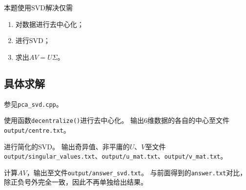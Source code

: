 本题使用SVD解决仅需
\begin{enumerate}
    \item 对数据进行去中心化；
    \item 进行SVD；
    \item 求出$AV = U\Sigma$。
\end{enumerate}

\subsection{具体求解}
参见\verb|pca_svd.cpp|。

使用函数\verb|decentralize()|进行去中心化。
输出6维数据的各自的中心至文件\verb|output/centre.txt|。

进行简化的SVD。
输出奇异值、非平庸的$U$、$V$至文件\verb|output/singular_values.txt|、\verb|output/u_mat.txt|、\verb|output/v_mat.txt|。

计算$AV$，输出至文件\verb|output/answer_svd.txt|。
与前面得到的\verb|answer.txt|对比，除正负号外完全一致，因此不再单独给出结果。

